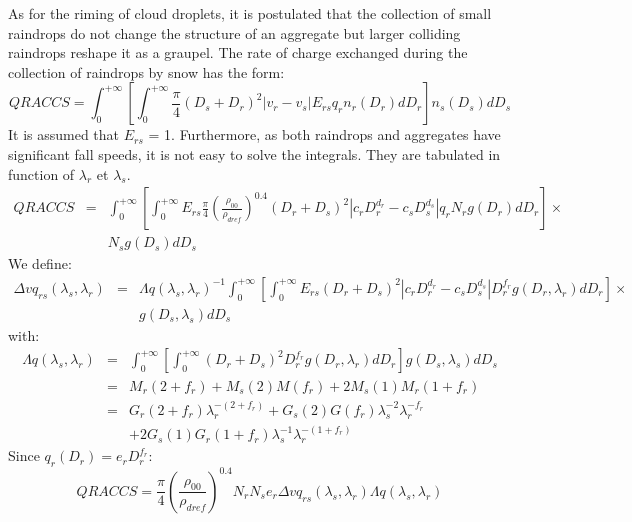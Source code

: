 As for the riming of cloud droplets, it is postulated that the collection of small raindrops do not change the structure of an aggregate but larger colliding raindrops reshape it as a graupel.
The rate of charge exchanged during the collection of raindrops by snow has the form:
\begin{equation}
  QRACCS = \int_0 ^{+ \infty} \left[ \int_0 ^{+ \infty}
           \frac{\pi}{4} (D_s + D_r)^2 |v_r - v_s| E_{rs} q_r n_r (D_r) dD_r
           \right] n_s (D_s) dD_s \nonumber
\end{equation}
It is assumed that $E_{rs}$ = 1.
Furthermore, as both raindrops and aggregates have significant fall speeds, it is not easy to solve the integrals.
They are tabulated in function of $\lambda _{r}$ et $\lambda _{s}$.
\begin{eqnarray}
  QRACCS & = & \int_0 ^{+ \infty} \left[ \int_0 ^{+ \infty}
           E_{rs} \frac{\pi}{4} 
           \left( \frac{\rho _{00}}{\rho _{dref}} \right)^{0.4}
           (D_r + D_s)^2 |c_r D_r ^{d_r} - c_s D_s ^{d_s}| q_r N_r g(D_r) dD_r
           \right] \times \nonumber \\
         &   & N_s g(D_s) dD_s \nonumber
\end{eqnarray}
We define:
\begin{eqnarray}
  \Delta vq_{rs}(\lambda _s, \lambda _r) & = &
    \Lambda q(\lambda _s, \lambda _r)^{-1} \int_0 ^{+ \infty} \left[
      \int_0 ^{+ \infty} E_{rs} (D_r + D_s)^2 
      |c_r D_r ^{d_r} - c_s D_s ^{d_s}| D_r ^{f_r} g(D_r , \lambda _r)dD_r 
    \right] \times \nonumber \\
                                         &   & g(D_s , \lambda _s) dD_s \nonumber
\end{eqnarray}
with:
\begin{eqnarray}
  \Lambda q(\lambda _s, \lambda _r) &=& \int_0 ^{+ \infty} \left[ 
    \int_0 ^{+ \infty} (D_r + D_s)^2 D_r ^{f_r} g(D_r , \lambda _r) dD_r
    \right] g(D_s , \lambda _s) dD_s \nonumber \\
   &=& M_r(2 + f_r) + M_s(2)M(f_r) + 2 M_s(1) M_r(1 + f_r) \nonumber \\
   &=& G_r(2 + f_r) \lambda _r ^{-(2 + f_r)} + G_s(2) G(f_r) \lambda _s ^{-2} 
       \lambda _r ^{-f_r} \nonumber \\
   & & + 2 G_s(1) G_r(1 + f_r) \lambda _s ^{-1} 
       \lambda _r ^{-(1+f_r)} 
\end{eqnarray}
Since $q_r (D_r) = e_r D_r ^{f_r}$:
\begin{equation}
  QRACCS = \frac{\pi}{4} \left( \frac{\rho _{00}}{\rho _{dref}} \right)^{0.4}
           N_r N_s e_r \Delta vq_{rs}(\lambda _s, \lambda _r)
           \Lambda q(\lambda _s, \lambda _r)
\end{equation}

